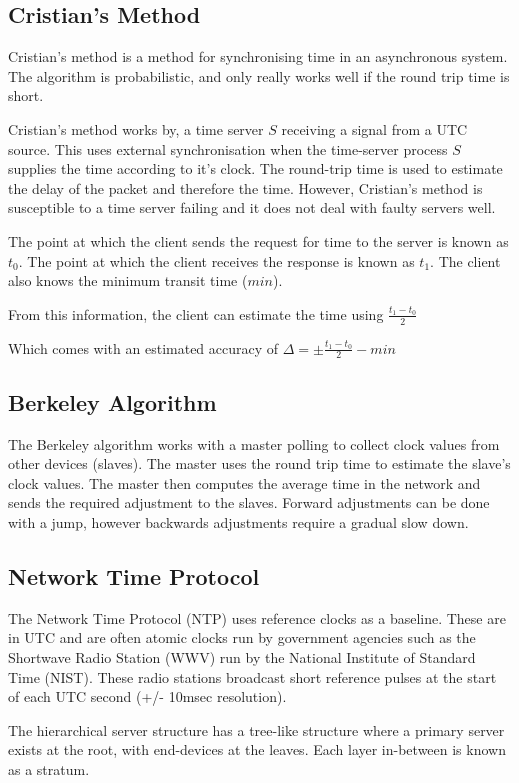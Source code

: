 \subsection{Cristian's Method}
Cristian's method is a method for synchronising time in an asynchronous system. The algorithm is probabilistic, and only really works well if the round trip time is short.

Cristian's method works by, a time server $S$ receiving a signal from a UTC source. This uses external synchronisation when the time-server process $S$ supplies the time according to it's clock. The round-trip time is used to estimate the delay of the packet and therefore the time. However, Cristian's method is susceptible to a time server failing and it does not deal with faulty servers well. 

The point at which the client sends the request for time to the server is known as $t_0$. The point at which the client receives the response is known as $t_1$. The client also knows the minimum transit time ($min$).

From this information, the client can estimate the time using $\displaystyle \frac{t_1-t_0}{2}$

Which comes with an estimated accuracy of $\displaystyle \Delta = \pm \frac{t_1-t_0}{2} - min$

\subsection{Berkeley Algorithm}
The Berkeley algorithm works with a master polling to collect clock values from other devices (slaves). The master uses the round trip time to estimate the slave's clock values. The master then computes the average time in the network and sends the required adjustment to the slaves. Forward adjustments can be done with a jump, however backwards adjustments require a gradual slow down. 

\subsection{Network Time Protocol}
The Network Time Protocol (NTP) uses reference clocks as a baseline. These are in UTC and are often atomic clocks run by government agencies such as the Shortwave Radio Station (WWV) run by the National Institute of Standard Time (NIST). These radio stations broadcast short reference pulses at the start of each UTC second (+/- 10msec resolution).

The hierarchical server structure has a tree-like structure where a primary server exists at the root, with end-devices at the leaves. Each layer in-between is known as a stratum. 

